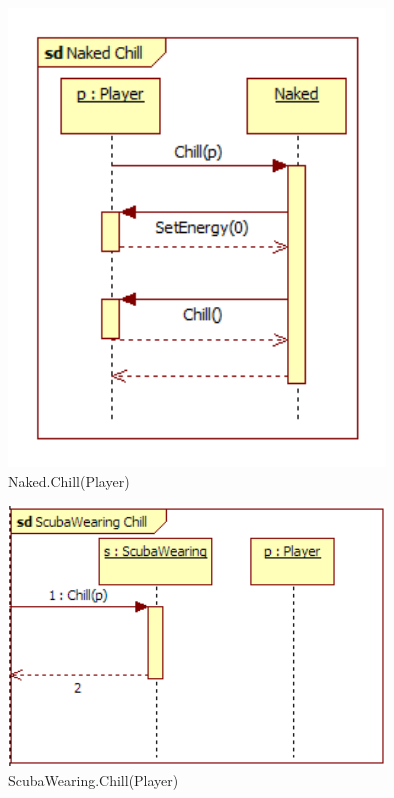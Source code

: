 \begin{figure}[H]
	\begin{center}
		\includegraphics[width=10cm]{chapters/chapter03/seqdiag/Naked_Chill.png}
		\caption{Naked.Chill(Player)}
		\label{fig:NakedChill}
	\end{center}
\end{figure}
\begin{figure}[H]
	\begin{center}
		\includegraphics[width=10cm]{chapters/chapter03/seqdiag/ScubaWearing_Chill.png}
		\caption{ScubaWearing.Chill(Player)}
		\label{fig:ScubaWearingChill}
	\end{center}
\end{figure}
